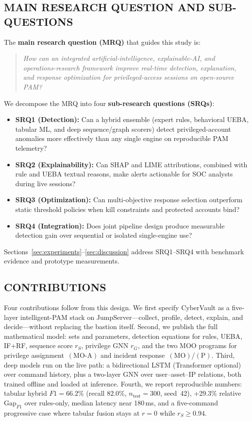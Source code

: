 \documentclass{ieeeaccess}
\begin{document}
\subsection{MAIN RESEARCH QUESTION AND SUB-QUESTIONS}
The \textbf{main research question (MRQ)} that guides this study is:
\begin{quote}
\textit{How can an integrated artificial-intelligence, explainable-AI, and operations-research framework improve real-time detection, explanation, and response optimization for privileged-access sessions on open-source PAM?}
\end{quote}
We decompose the MRQ into four \textbf{sub-research questions (SRQs)}:
\begin{itemize}
\item \textbf{SRQ1 (Detection):} Can a hybrid ensemble (expert rules, behavioral UEBA, tabular ML, and deep sequence/graph scorers) detect privileged-account anomalies more effectively than any single engine on reproducible PAM telemetry?
\item \textbf{SRQ2 (Explainability):} Can SHAP and LIME attributions, combined with rule and UEBA textual reasons, make alerts actionable for SOC analysts during live sessions?
\item \textbf{SRQ3 (Optimization):} Can multi-objective response selection outperform static threshold policies when kill constraints and protected accounts bind?
\item \textbf{SRQ4 (Integration):} Does joint pipeline design produce measurable detection gain over sequential or isolated single-engine use?
\end{itemize}
Sections~\ref{sec:experiments}--\ref{sec:discussion} address SRQ1--SRQ4 with benchmark evidence and prototype measurements.

\subsection{CONTRIBUTIONS}
Four contributions follow from this design.
We first specify CyberVault as a five-layer intelligent-PAM stack on JumpServer---collect, profile, detect, explain, and decide---without replacing the bastion itself.
Second, we publish the full mathematical model: sets and parameters, detection equations for rules, UEBA, IF+RF, sequence score $r_S$, privilege GNN $r_G$, and the two MOO programs for privilege assignment~$(\mathrm{MO}\text{-}\mathrm{A})$ and incident response~$(\mathrm{MO})$/$(\mathrm{P})$.
Third, deep models run on the live path: a bidirectional LSTM (Transformer optional) over command history, plus a two-layer GNN over user--asset--IP relations, both trained offline and loaded at inference.
Fourth, we report reproducible numbers: tabular hybrid $F1=66.2\%$ (recall $82.0\%$, $n_{\mathrm{test}}=300$, seed~42), +29.3\% relative $\mathrm{Gap}_{F1}$ over rules-only, median latency near 180\,ms, and a five-command progressive case where tabular fusion stays at $r{=}0$ while $r_S\geq 0.94$.
\end{document}
